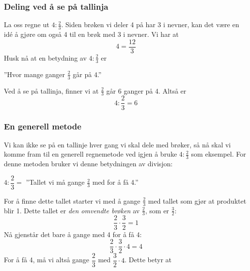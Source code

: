 \section{\brdelmbr}
\subsubsection{Deling ved å se på tallinja}
La oss regne ut $ 4:\frac{2}{3}  $. Siden brøken vi deler 4 på har 3 i nevner, kan det være en idé å gjøre om også 4 til en brøk med $ 3 $ i nevner. Vi har at 
\[ 4=\dfrac{12}{3} \]
Husk nå at en betydning av $ 4:\frac{2}{3} $ er
\begin{center}
	''Hvor mange ganger $ \frac{2}{3} $ går på 4.''
\end{center}
Ved å se på tallinja, finner vi at $ \frac{2}{3} $ går 6 ganger på 4. Altså er
\[ 4:\frac{2}{3}=6 \]
\newpage
\subsubsection{En generell metode}
Vi kan ikke se på en tallinje hver gang vi skal dele med brøker, så nå skal vi komme fram til en generell regnemetode ved igjen å bruke $ 4:\frac{2}{3} $ som eksempel. For denne metoden bruker vi denne betydningen av divisjon:
\begin{center}
	$  4:\dfrac{2}{3}= $ ''Tallet vi må gange $ \frac{2}{3} $ med for å få 4.''
\end{center}
For å finne dette tallet starter vi med å gange $ \frac{2}{3} $ med tallet som gjør at produktet blir 1. Dette tallet er \textit{den omvendte brøken} av $ \frac{2}{3} $, som er $ \frac{3}{2} $:
\[ \frac{2}{3}\cdot\frac{3}{2}=1 \]
Nå gjenstår det bare å gange med 4 for å få 4:
\[ \frac{2}{3}\cdot\frac{3}{2}\cdot4=4 \]
For å få 4, må vi altså gange $ \dfrac{2}{3} $ med $ \dfrac{3}{2}\cdot4 $. Dette betyr at
\reg[\delmbr \label{delmbr}]{
Når vi deler et tall med en brøk, ganger vi tallet med den omvendte brøken.
}
\newpage
{}
\newpage
